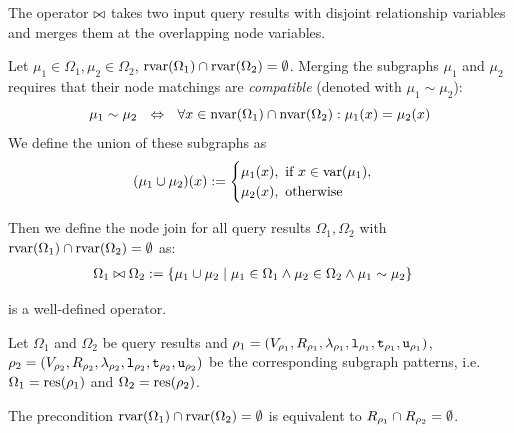 \begin{definition}
\label{def:node-join}
The  operator $\bowtie$ takes two input query results with disjoint relationship variables
and merges them at the overlapping node variables.

Let $\mu_1 \in \Omega_1, \mu_2 \in \Omega_2$, $\textnormal{rvar}(\Omega_1) \cap \textnormal{rvar}(\Omega_2) = \emptyset$.
Merging the subgraphs $\mu_1$ and $\mu_2$ requires that their node matchings
are \emph{compatible} (denoted with $\mu_1 \sim \mu_2$):
\[
  \mu_1 \sim \mu_2 ~~\Leftrightarrow~~ \forall x \in \textnormal{nvar}(\Omega_1) \cap \textnormal{nvar}(\Omega_2): \mu_1(x)=\mu_2(x)
\]
We define the union of these subgraphs as
\[
  (\mu_1 \cup \mu_2)(x) := \begin{cases}
                               \mu_1(x), \text{ if } x \in \textnormal{var}(\mu_1), \\
                               \mu_2(x), \text{ otherwise }
                             \end{cases}
\]

Then we define the node join for all query results $\Omega_1, \Omega_2$
with $\textnormal{rvar}(\Omega_1) \cap \textnormal{rvar}(\Omega_2) = \emptyset$ as:
\begin{align*}
  \Omega_1 \bowtie \Omega_2 &:= \{ \mu_1 \cup \mu_2 \mid \mu_1 \in \Omega_1 \land \mu_2 \in \Omega_2 \land \mu_1 \sim \mu_2 \}
\end{align*}

\begin{proofof}{ is a well-defined operator.}
\label{proof:node-join-well-defined}

Let $\Omega_1$ and $\Omega_2$ be query results and
$\rho_1 = (V_{\rho_1}, R_{\rho_1}, \lambda_{\rho_1}, \texttt{l}_{\rho_1}, \texttt{t}_{\rho_1}, \texttt{u}_{\rho_1})$, 
$\rho_2 = (V_{\rho_2}, R_{\rho_2}, \lambda_{\rho_2}, \texttt{l}_{\rho_2}, \texttt{t}_{\rho_2}, \texttt{u}_{\rho_2})$
be the corresponding subgraph patterns, i.e.
$\Omega_1 = \text{res}(\rho_1)$ and $\Omega_2 = \text{res}(\rho_2)$.

The precondition $\textnormal{rvar}(\Omega_1) \cap \textnormal{rvar}(\Omega_2) = \emptyset$ is
equivalent to $R_{\rho_1} \cap R_{\rho_2} = \emptyset$.


\end{proofof}
\end{definition}
